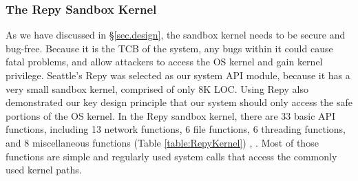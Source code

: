 \subsubsection{The Repy Sandbox Kernel}

As we have discussed in \S{\ref{sec.design}}, the sandbox kernel needs to be secure and bug-free. 
Because it is the TCB of the system, any bugs within it could cause fatal problems, 
and allow attackers to access the OS kernel and gain kernel privilege. 
Seattle's Repy was selected as our system API module, because it has a very small sandbox kernel, 
comprised of only 8K LOC. Using Repy also demonstrated our key design principle that 
our system should only access the safe portions of the OS kernel. In the Repy sandbox kernel, 
there are 33 basic API functions, including 13 network functions, 6 file functions, 6 threading functions, 
and 8 miscellaneous functions (Table \ref{table:RepyKernel}) \cite{Repy-10}, \cite{RepyKernel}. Most of those functions are simple and 
regularly used system calls that access the commonly used kernel paths. 

